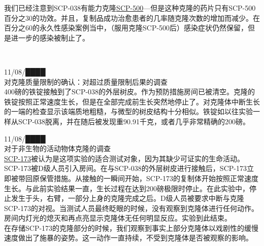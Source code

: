 我们已经注意到SCP-038有能力克隆\hyperref[chap:SCP-500]{SCP-500}—但是这种克隆的药片只有SCP-500百分之30的功效。并且，复制品成功治愈患者的几率随克隆次数的增加而减少。在百分之60的永久性感染案例当中，（服用克隆SCP-500后）感染症状仍然保留，但是进一步的感染被制止了。

\hr

\\
\textsubscript{}

11\slash 08\slash ████\\
对克隆质量限制的确认：对超过质量限制后果的调查\\
400磅的铁锭接触到了SCP-038的外层树皮。作为预防措施房间已被清空。克隆的铁锭按照正常速度生长，但是在全部完成前生长突然地停止了。对克隆体中断生长的一端的检查显示该端质地粗糙，与微型的树皮结构十分相似。铁锭如以往实验一样从SCP-038脱离，并在随后被发现重90.91千克，或者几乎非常精确的200磅。

11\slash 08\slash ████\\
对于非生物的活动物体克隆的调查\\
\hyperref[chap:SCP-173]{SCP-173}被认为是这项实验的适合测试对象，因为其缺少可证实的生命活动。SCP-173被D级人员引入房间。在与SCP-038的外层树皮进行接触后，SCP-173立即被带回原保管措施。从接触的一瞬间开始，SCP-173的复制体开始按照正常速度生长。与此前实验结果一直，生长过程在达到200磅极限时停止。在此实验中，停止发生于头，右臂，一部分上身的克隆完成之后。D级人员被要求中断与克隆SCP-173的对视。当测试人员最终眨眼的时候，没有观察到克隆体进行任何动作。房间内灯光的熄灭和再点亮显示克隆体无任何明显反应。实验到此结束。\\
在存储SCP-173的克隆部分的时候，我们观察到事实上部分克隆体以戏剧性的缓慢速度做出了施暴的姿势。这一动作一直持续，不受到克隆体是否被观察的影响。
